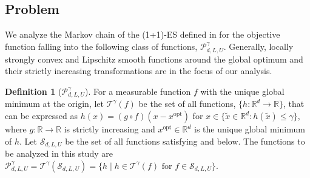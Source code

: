 \documentclass[journal]{IEEEtran}
\providecommand{\R}{\mathbb{R}} %
\providecommand{\E}{\mathbb{E}} %
\providecommand{\T}{\mathrm{T}} %
\renewcommand{\geq}{\geqslant} %
\renewcommand{\leq}{\leqslant} %
\newtheorem{theorem}{Theorem}[]
\theoremstyle{definition}
\newtheorem{definition}[]{Definition}
\begin{document}

\subsection{Problem}\label{subsec:problem}

We analyze the Markov chain of the (1+1)-ES defined in  for the objective function falling into the following class of functions, $\mathcal{P}_{d, L, U}^{\gamma}$.
Generally, locally strongly convex and Lipschitz smooth functions around the global optimum and their strictly increasing transformations are in the focus of our analysis.

\begin{definition}[$\mathcal{P}_{d, L, U}^\gamma$]\label{def:problem}
For a measurable function $f$ with the unique global minimum at the origin, let $\mathcal{T}^{\gamma}(f)$ be the set of all functions, $\{h: \R^d \to \R\}$, that can be expressed as $h(x) = (g \circ f)(x - x^\mathrm{opt})$ for $x \in \{\tilde{x} \in \R^d : h(\tilde{x}) \leq \gamma\}$, where $g: \R\to\R$ is strictly increasing and $x^\mathrm{opt} \in \R^d$ is the unique global minimum of $h$.
Let $\mathcal{S}_{d,L,U}$ be the set of all functions satisfying  and  below. 
The functions to be analyzed in this study are $\mathcal{P}_{d, L, U}^{\gamma} = \mathcal{T}^{\gamma}(\mathcal{S}_{d, L, U}) = \{h \mid h \in \mathcal{T}^\gamma(f) \text{ for } f \in \mathcal{S}_{d, L, U}\}$.
\end{definition}
\end{document}
